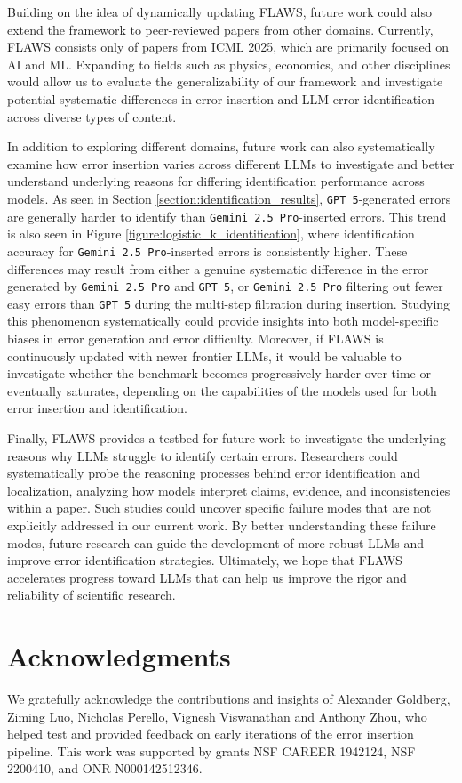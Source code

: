 \documentclass{article}
\newcommand{\gemini}{\texttt{Gemini 2.5 Pro}}
\newcommand{\gpt}{\texttt{GPT 5}}
\newcommand{\benchmark}{FLAWS}
\begin{document}
Building on the idea of dynamically updating \benchmark{}, future work could also extend the framework to peer-reviewed papers from other domains. Currently, \benchmark{} consists only of papers from ICML 2025, which are primarily focused on AI and ML. Expanding to fields such as physics, economics, and other disciplines would allow us to evaluate the generalizability of our framework and investigate potential systematic differences in error insertion and LLM error identification across diverse types of content.

In addition to exploring different domains, future work can also systematically examine how error insertion varies across different LLMs to investigate and better understand underlying reasons for differing identification performance across models. As seen in Section \ref{section:identification_results}, \gpt{}-generated errors are generally harder to identify than \gemini{}-inserted errors. This trend is also seen in Figure \ref{figure:logistic_k_identification}, where identification accuracy for \gemini{}-inserted errors is consistently higher. These differences may result from either a genuine systematic difference in the error generated by \gemini{} and \gpt{}, or \gemini{} filtering out fewer easy errors than \gpt{} during the multi-step filtration during insertion. Studying this phenomenon systematically could provide insights into both model-specific biases in error generation and error difficulty. Moreover, if \benchmark{} is continuously updated with newer frontier LLMs, it would be valuable to investigate whether the benchmark becomes progressively harder over time or eventually saturates, depending on the capabilities of the models used for both error insertion and identification.

Finally, \benchmark{} provides a testbed for future work to investigate the underlying reasons why LLMs struggle to identify certain errors. Researchers could systematically probe the reasoning processes behind error identification and localization, analyzing how models interpret claims, evidence, and inconsistencies within a paper. Such studies could uncover specific failure modes that are not explicitly addressed in our current work. By better understanding these failure modes, future research can guide the development of more robust LLMs and improve error identification strategies. Ultimately, we hope that \benchmark{} accelerates progress toward LLMs that can help us improve the rigor and reliability of scientific research.

\section*{Acknowledgments}
We gratefully acknowledge the contributions and insights of Alexander Goldberg, Ziming Luo, Nicholas Perello, Vignesh Viswanathan and Anthony Zhou, who helped test and provided feedback on early iterations of the error insertion pipeline. This work was supported by grants NSF CAREER 1942124, NSF 2200410, and ONR N000142512346.
\end{document}
